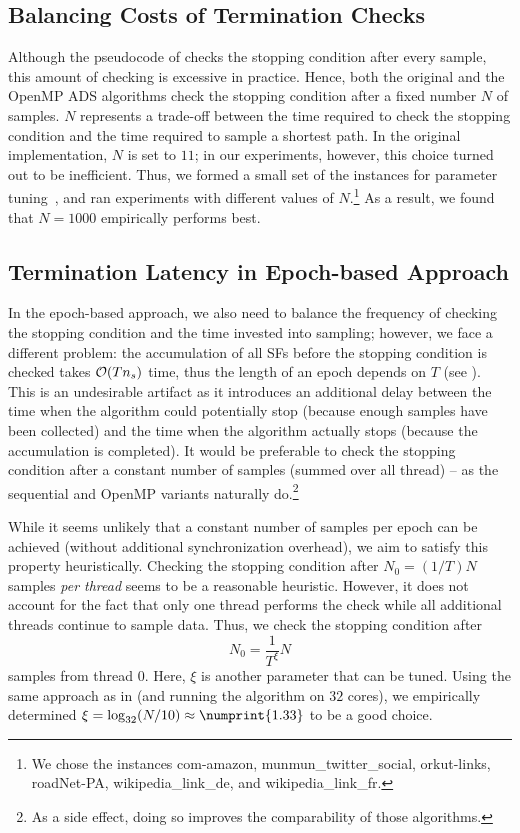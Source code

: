 \subsection{Balancing Costs of Termination Checks}
\label{sec:betw-apx:balancing-costs}
%
Although the pseudocode of
checks the stopping condition after every sample, this amount of checking
is excessive in practice. Hence, both the original \kadabra and the OpenMP
ADS algorithms check the stopping condition after a fixed number $N$
of samples. $N$ represents a trade-off between the time required to
check the stopping condition and the time required to sample
a shortest path.
In the original \kadabra implementation, $N$ is set to $11$;
in our experiments, however, this choice turned out to be
inefficient. Thus, we formed a small set of the instances
for parameter tuning~\cite{DBLP:journals/algorithms/AngrimanGLMNPT19},
and ran experiments with different values of
$N$.\footnote{We chose the instances com-amazon, munmun\_twitter\_social,
orkut-links, roadNet-PA, wikipedia\_link\_de, and wikipedia\_link\_fr.}
As a result, we found that $N = 1000$ empirically performs best.

\subsection{Termination Latency in Epoch-based Approach}
\label{sec:betw-apx:termination-latency}
%
In the epoch-based approach, we also need to balance the frequency
of checking the stopping condition and the time invested into
sampling; however, we face a different problem: the accumulation
of all SFs before the stopping condition is checked takes $\mathcal{O}(Tn_s)$
time, thus the length of an epoch depends on $T$
(see ). This is an undesirable
artifact as it introduces an additional delay between the time
when the algorithm could potentially stop (because enough
samples have been collected) and the time when the algorithm
actually stops (because the accumulation is completed).
It would be preferable to check the stopping condition after
a constant number of samples (summed over all thread) -- as the
sequential and OpenMP variants naturally do.\footnote{As a side
effect, doing so improves the comparability of those algorithms.}

While it seems unlikely that a constant number of samples per epoch
can be achieved (without additional synchronization overhead),
we aim to satisfy this property heuristically.
Checking the stopping condition after $N_0 = (1/T)N$ samples
\emph{per thread} seems to be a reasonable heuristic.
However, it does not account for the fact that only one thread
performs the check while all additional threads continue to
sample data. Thus, we check the stopping condition after
%
\[
    N_0 = \frac{1}{T^\xi}N
\]
%
samples from thread 0. Here, $\xi$ is another parameter
that can be tuned. Using the same approach as in
 (and running the
algorithm on $32$ cores), we empirically determined
$\xi = \log_{32}(N/10) \approx \numprint{1.33}$ to be
a good choice.

